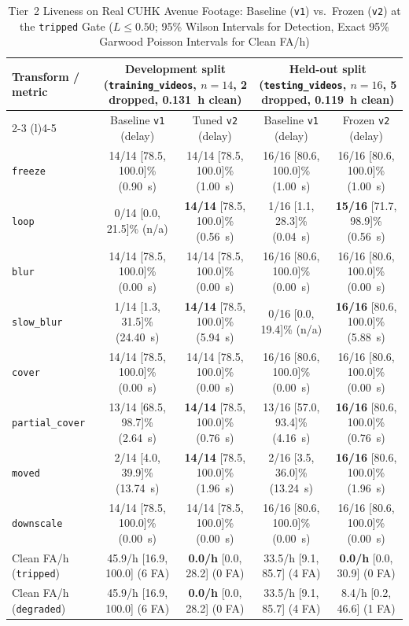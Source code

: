 \documentclass[journal]{IEEEtran}
\begin{document}
\begin{table}[!t]
\caption{Tier~2 Liveness on Real CUHK Avenue Footage: Baseline (\texttt{v1}) vs.\ Frozen (\texttt{v2}) at the \texttt{tripped} Gate ($L \le 0.50$; 95\% Wilson Intervals for Detection, Exact 95\% Garwood Poisson Intervals for Clean FA/h)}
\label{tab:avenue}
\centering
\footnotesize
\setlength{\tabcolsep}{4pt}
\begin{tabular}{@{}lcccc@{}}
\toprule
Transform / metric & \multicolumn{2}{c}{Development split (\texttt{training\_videos}, $n{=}14$, 2 dropped, 0.131~h clean)} & \multicolumn{2}{c}{Held-out split (\texttt{testing\_videos}, $n{=}16$, 5 dropped, 0.119~h clean)}\\
\cmidrule(lr){2-3} \cmidrule(l){4-5}
 & Baseline \texttt{v1} (delay) & Tuned \texttt{v2} (delay) & Baseline \texttt{v1} (delay) & Frozen \texttt{v2} (delay)\\
\midrule
\texttt{freeze}        & 14/14 [78.5, 100.0]\% (0.90~s) & 14/14 [78.5, 100.0]\% (1.00~s) & 16/16 [80.6, 100.0]\% (1.00~s) & 16/16 [80.6, 100.0]\% (1.00~s)\\
\texttt{loop}          & 0/14 [0.0, 21.5]\% (n/a)       & \textbf{14/14} [78.5, 100.0]\% (0.56~s) & 1/16 [1.1, 28.3]\% (0.04~s)    & \textbf{15/16} [71.7, 98.9]\% (0.56~s)\\
\texttt{blur}          & 14/14 [78.5, 100.0]\% (0.00~s) & 14/14 [78.5, 100.0]\% (0.00~s) & 16/16 [80.6, 100.0]\% (0.00~s) & 16/16 [80.6, 100.0]\% (0.00~s)\\
\texttt{slow\_blur}    & 1/14 [1.3, 31.5]\% (24.40~s)   & \textbf{14/14} [78.5, 100.0]\% (5.94~s) & 0/16 [0.0, 19.4]\% (n/a)       & \textbf{16/16} [80.6, 100.0]\% (5.88~s)\\
\texttt{cover}         & 14/14 [78.5, 100.0]\% (0.00~s) & 14/14 [78.5, 100.0]\% (0.00~s) & 16/16 [80.6, 100.0]\% (0.00~s) & 16/16 [80.6, 100.0]\% (0.00~s)\\
\texttt{partial\_cover}& 13/14 [68.5, 98.7]\% (2.64~s)  & \textbf{14/14} [78.5, 100.0]\% (0.76~s) & 13/16 [57.0, 93.4]\% (4.16~s)  & \textbf{16/16} [80.6, 100.0]\% (0.76~s)\\
\texttt{moved}         & 2/14 [4.0, 39.9]\% (13.74~s)   & \textbf{14/14} [78.5, 100.0]\% (1.96~s) & 2/16 [3.5, 36.0]\% (13.24~s)   & \textbf{16/16} [80.6, 100.0]\% (1.96~s)\\
\texttt{downscale}     & 14/14 [78.5, 100.0]\% (0.00~s) & 14/14 [78.5, 100.0]\% (0.00~s) & 16/16 [80.6, 100.0]\% (0.00~s) & 16/16 [80.6, 100.0]\% (0.00~s)\\
\midrule
Clean FA/h (\texttt{tripped})  & 45.9/h [16.9, 100.0] (6 FA) & \textbf{0.0/h} [0.0, 28.2] (0 FA) & 33.5/h [9.1, 85.7] (4 FA) & \textbf{0.0/h} [0.0, 30.9] (0 FA)\\
Clean FA/h (\texttt{degraded}) & 45.9/h [16.9, 100.0] (6 FA) & \textbf{0.0/h} [0.0, 28.2] (0 FA) & 33.5/h [9.1, 85.7] (4 FA) & 8.4/h [0.2, 46.6] (1 FA)\\
\bottomrule
\end{tabular}
\end{table}
\end{document}
